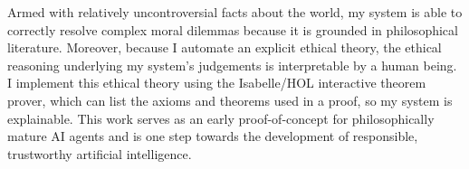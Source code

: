\begin{isabellebody}
\begin{isamarkuptext}
Armed with relatively uncontroversial facts about the world, my system is able to correctly
resolve complex moral dilemmas because it is grounded in philosophical literature.
Moreover, because I automate an explicit ethical theory, the ethical reasoning underlying my system's judgements
is interpretable by a human being. I implement this ethical theory using the Isabelle/HOL interactive theorem prover, which can 
list the axioms and theorems used in a proof, so my system is explainable. This work serves as an early 
proof-of-concept for philosophically mature AI agents and is one step towards the development of 
responsible, trustworthy artificial intelligence.%
\end{isamarkuptext}\isamarkuptrue%
%
\isadelimtheory
%
\endisadelimtheory
%
\isatagtheory
%
\endisatagtheory
{\isafoldtheory}%
%
\isadelimtheory
%
\endisadelimtheory
%
\end{isabellebody}%
\endinput
